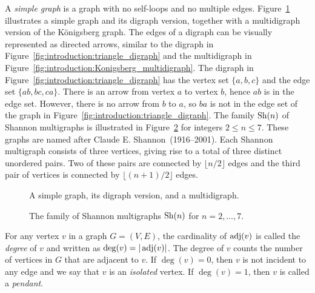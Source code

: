 A \emph{simple graph} is a graph with no self-loops and no multiple
edges. Figure~\ref{fig:introduction:simple_graph_digraph_multidigraph}
illustrates a simple graph and its digraph version, together with a
multidigraph version of the K\"onigsberg graph. The edges of a digraph
can be visually represented as directed arrows, similar to the digraph
in
Figure~\ref{fig:introduction:triangle_digraph} and the multidigraph in
Figure~\ref{fig:introduction:Konigsberg_multidigraph}. The digraph in
Figure~\ref{fig:introduction:triangle_digraph} has the vertex set
$\{a, b, c\}$ and the edge set $\{ab, bc, ca\}$. There is an arrow
from vertex $a$ to vertex $b$, hence $ab$ is in the edge set. However,
there is no arrow from $b$ to $a$, so $ba$ is not in the edge set of
the graph in Figure~\ref{fig:introduction:triangle_digraph}. The
family $\operatorname*{Sh}(n)$ of Shannon multigraphs is illustrated in
Figure~\ref{fig:introduction:Shannon_multigraphs} for integers
$2 \leq n \leq 7$. These graphs are named after Claude
E. Shannon~(1916--2001). Each Shannon multigraph consists of three
vertices, giving rise to a total of three distinct unordered
pairs. Two of these pairs are connected by $\lfloor n/2 \rfloor$
edges and the third pair of vertices is connected by
$\lfloor (n + 1) / 2 \rfloor$ edges.

\begin{figure}[!htbp]
\centering

\caption{A simple graph, its digraph version, and a multidigraph.}
\label{fig:introduction:simple_graph_digraph_multidigraph}
\end{figure}

\begin{figure}[!htbp]
\centering

\caption{The family of Shannon multigraphs $\operatorname*{Sh}(n)$ for $n = 2,\dots,7$.}
\label{fig:introduction:Shannon_multigraphs}
\end{figure}

\begin{definition}
{\rm
For any vertex $v$ in a graph $G = (V, E)$, the
cardinality of $\operatorname*{adj}(v)$ is called the
\emph{degree} of $v$ and written as
$\deg(v) = |\operatorname*{adj}(v)|$\index{$\deg$}. The degree of $v$ counts the
number of vertices in $G$ that are adjacent to $v$. If $\deg(v) = 0$,
then $v$ is not incident to any edge and we say that $v$ is an
\emph{isolated} vertex. If $\deg(v) = 1$,
then $v$ is called a \emph{pendant}.
}
\end{definition}

